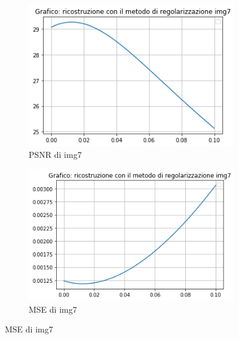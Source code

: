 \begin{figure}[H]\ContinuedFloat
    \centering
    \begin{subfigure}{0.5\textwidth}
        \centering
        \includegraphics[width=\textwidth]{output/PSNR/outputPSNR-img7.png}
        \caption{PSNR di img7}
        \label{fig:img7PSNR}
    \end{subfigure}\hfill
    \begin{subfigure}{0.5\textwidth}
        \centering
        \includegraphics[width=\textwidth]{output/MSE/outputMSE-img7.png}
        \caption{MSE di img7}
        \label{fig:img7MSE}
    \end{subfigure}


\end{figure}
